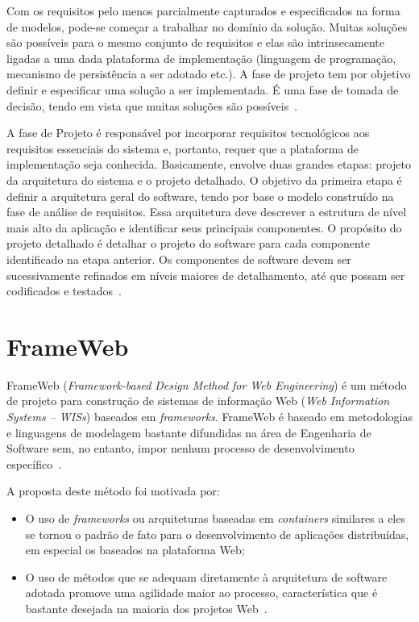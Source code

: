 Com os requisitos pelo menos parcialmente capturados e especificados na forma de modelos, pode-se começar a trabalhar no domínio da solução. Muitas soluções são possíveis para o mesmo conjunto de requisitos e elas são intrinsecamente ligadas a uma dada plataforma de implementação (linguagem de programação, mecanismo de persistência a ser adotado etc.). A fase de projeto tem por objetivo definir e especificar uma solução a ser implementada. É uma fase de tomada de decisão, tendo em vista que muitas soluções são possíveis~\cite{falboEngReq}.

A fase de Projeto é responsável por incorporar requisitos tecnológicos aos requisitos essenciais do sistema e, portanto, requer que a plataforma de implementação seja conhecida. Basicamente, envolve duas grandes etapas: projeto da arquitetura do sistema e o projeto detalhado. O objetivo da primeira etapa é definir a arquitetura geral do software, tendo por base o modelo construído na fase de análise de requisitos. Essa arquitetura deve descrever a estrutura de nível mais alto da aplicação e identificar seus principais componentes. O propósito do projeto detalhado é detalhar o projeto do software para cada componente identificado na etapa anterior. Os componentes de software devem ser sucessivamente refinados em níveis maiores de detalhamento, até que possam ser codificados e testados~\cite{falboEngSoft}. 






\section{FrameWeb}
\label{sec-referencial-frameweb}

FrameWeb (\textit{Framework-based Design Method for Web Engineering}) é um método de projeto para construção de sistemas de informação Web (\textit{Web Information Systems – WISs}) baseados em \textit{frameworks}. FrameWeb é baseado em metodologias e linguagens de modelagem bastante difundidas na área de Engenharia de Software sem, no entanto, impor nenhum processo de desenvolvimento específico~\cite{vitorFrameWeb}.

A proposta deste método foi motivada por:

\begin{itemize}
	\item O uso de \textit{frameworks} ou arquiteturas baseadas em \textit{containers} similares a eles se tornou o padrão de fato para o desenvolvimento de aplicações distribuídas, em especial os baseados na plataforma Web;
	
	\item O uso de métodos que se adequam diretamente à arquitetura de software adotada promove uma agilidade maior ao processo, característica que é bastante desejada na maioria dos projetos Web~\cite{presmannSoft}.
\end{itemize}

